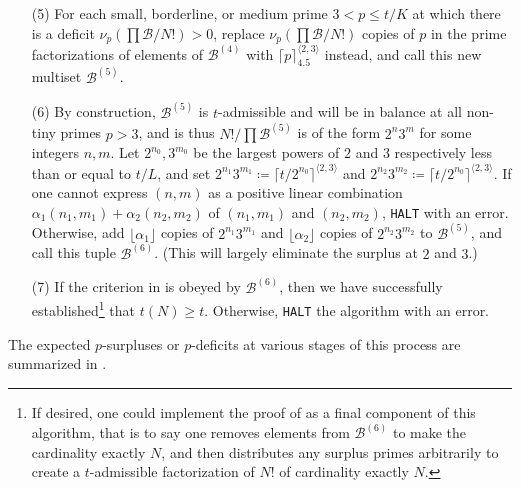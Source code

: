 \documentclass[12pt,a4paper,reqno]{amsart}
\numberwithin{equation}{section}
\theoremstyle{plain}
\theoremstyle{definition}
\newcommand\tuple{{\mathcal B}}
\begin{document}
\begin{enumerate}
\item[(5)] For each small, borderline, or medium prime $3 < p \leq t/K$ at which there is a deficit $\nu_p(\prod \tuple/N!) > 0$, replace $\nu_p(\prod \tuple/N!)$ copies of $p$ in the prime factorizations of elements of $\tuple^{(4)}$ with $\lceil p \rceil^{\langle 2,3 \rangle}_{4.5}$ instead, and call this new multiset $\tuple^{(5)}$.  
\item[(6)] By construction, $\tuple^{(5)}$ is $t$-admissible and will be in balance at all non-tiny primes $p>3$, and is thus $N!/\prod \tuple^{(5)}$ is of the form $2^n 3^m$ for some integers $n,m$.  Let $2^{n_0}, 3^{m_0}$ be the largest powers of $2$ and $3$ respectively less than or equal to $t/L$, and set $2^{n_1} 3^{m_1} \coloneqq \lceil t/2^{n_0} \rceil^{\langle 2,3 \rangle}$ and $2^{n_2} 3^{m_2} \coloneqq \lceil t/2^{n_0} \rceil^{\langle 2,3 \rangle}$.  If one cannot express $(n,m)$ as a positive linear combination $\alpha_1 (n_1,m_1) + \alpha_2 (n_2,m_2)$ of $(n_1,m_1)$ and $(n_2,m_2)$, \texttt{HALT} with an error.  Otherwise, add $\lfloor \alpha_1 \rfloor$ copies of $2^{n_1} 3^{m_1}$ and $\lfloor \alpha_2 \rfloor$ copies of $2^{n_2} 3^{m_2}$ to $\tuple^{(5)}$, and call this tuple $\tuple^{(6)}$.  (This will largely eliminate the surplus at $2$ and $3$.)
\item[(7)] If the criterion in  is obeyed by $\tuple^{(6)}$, then we have successfully established\footnote{If desired, one could implement the proof of  as a final component of this algorithm, that is to say one removes elements from $\tuple^{(6)}$ to make the cardinality exactly $N$, and then distributes any surplus primes arbitrarily to create a $t$-admissible factorization of $N!$ of cardinality exactly $N$.} that $t(N) \geq t$.  Otherwise, \texttt{HALT} the algorithm with an error. 
\end{enumerate}

The expected $p$-surpluses or $p$-deficits at various stages of this process are summarized in .
\end{document}
